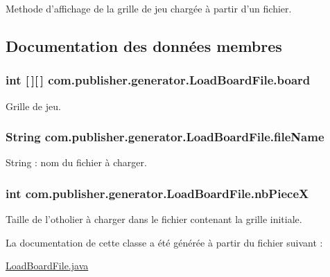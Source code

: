 Methode d'affichage de la grille de jeu chargée à partir d'un fichier. 

\subsection{Documentation des données membres}
\hypertarget{classcom_1_1publisher_1_1generator_1_1LoadBoardFile_a46201e34390389b894c399a8bc300438}{
\subsubsection[{board}]{\setlength{\rightskip}{0pt plus 5cm}int \mbox{[}$\,$\mbox{]}\mbox{[}$\,$\mbox{]} com.\-publisher.\-generator.\-Load\-Board\-File.\-board\hspace{0.3cm}{\ttfamily [private]}}}\label{classcom_1_1publisher_1_1generator_1_1LoadBoardFile_a46201e34390389b894c399a8bc300438}
Grille de jeu. \hypertarget{classcom_1_1publisher_1_1generator_1_1LoadBoardFile_a0799f71c15c27e5104b856399507777f}{
\subsubsection[{file\-Name}]{\setlength{\rightskip}{0pt plus 5cm}String com.\-publisher.\-generator.\-Load\-Board\-File.\-file\-Name\hspace{0.3cm}{\ttfamily [private]}}}\label{classcom_1_1publisher_1_1generator_1_1LoadBoardFile_a0799f71c15c27e5104b856399507777f}
String \-: nom du fichier à charger. \hypertarget{classcom_1_1publisher_1_1generator_1_1LoadBoardFile_aa7c3179e325255a57289225cbc68a83f}{
\subsubsection[{nb\-Piece\-X}]{\setlength{\rightskip}{0pt plus 5cm}int com.\-publisher.\-generator.\-Load\-Board\-File.\-nb\-Piece\-X\hspace{0.3cm}{\ttfamily [private]}}}\label{classcom_1_1publisher_1_1generator_1_1LoadBoardFile_aa7c3179e325255a57289225cbc68a83f}
Taille de l'otholier à charger dans le fichier contenant la grille initiale. 

La documentation de cette classe a été générée à partir du fichier suivant \-:\begin{DoxyCompactItemize}
\item 
\hyperlink{LoadBoardFile_8java}{Load\-Board\-File.\-java}\end{DoxyCompactItemize}
